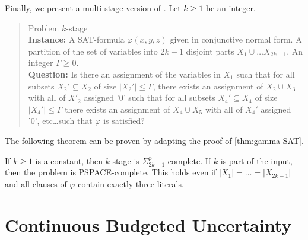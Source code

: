 \documentclass[a4paper,abstracton]{scrartcl}
\begin{document}
Finally, we present a multi-stage version of {\radj}. Let $k \geq 1$ be an integer.

\begin{quote}
Problem $k$-stage {\radj}
\\
\textbf{Instance:}  A SAT-formula $\varphi(x,y,z)$ given in conjunctive normal form. A partition of the set of variables into $2k-1$ disjoint parts $X_1 \cup \dots X_{2k-1}$. An integer $\Gamma \geq 0$.  
\\
\textbf{Question:} Is there an assignment of the variables in $X_1$ such that for all subsets $X_2' \subseteq X_2$ of size $|X_2'| \leq \Gamma$, there exists an assignment of $X_2 \cup X_3$ with all of $X'_2$ assigned '0' such that for all subsets $X_4' \subseteq X_4$ of size $|X_4'| \leq \Gamma$ there exists an assignment of $X_4 \cup X_5$ with all of $X_4'$ assigned '0', etc\dots such that $\varphi$ is satisfied?
\end{quote}

The following theorem can be proven by adapting the proof of \cref{thm:gamma-SAT}. 

\begin{theorem}
\label{thm:multi-stage-gamma-sat}
If $k \geq 1$ is a constant, then $k$-stage {\radj} is $\Sigma_{2k-1}^p$-complete. If $k$ is part of the input, then the problem is PSPACE-complete. This holds even if $|X_1|=\dots=|X_{2k-1}|$ and all clauses of $\varphi$ contain exactly three literals.
\end{theorem}


\section{Continuous Budgeted Uncertainty}
\label{sec:contbudgeted}
\end{document}
